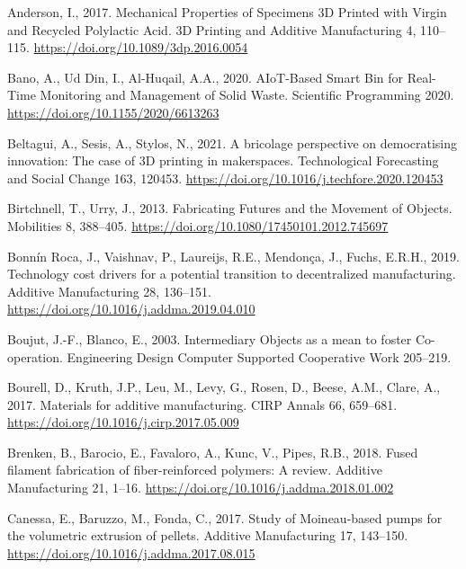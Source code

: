 \documentclass[
  11pt,
]{article}
\newlength{\cslhangindent}
\newlength{\cslentryspacingunit} %
\newenvironment{CSLReferences}[2] %
 {%
  \setlength{\parindent}{0pt}
  \ifodd #1
  \let\oldpar\par
  \def\par{\hangindent=\cslhangindent\oldpar}
  \fi
  \setlength{\parskip}{#2\cslentryspacingunit}
 }%
 {}
\begin{document}
\hypertarget{refs}{}
\begin{CSLReferences}{1}{0}
\leavevmode{}%
Anderson, I., 2017. Mechanical {Properties} of {Specimens 3D Printed}
with {Virgin} and {Recycled Polylactic Acid}. 3D Printing and Additive
Manufacturing 4, 110--115. \url{https://doi.org/10.1089/3dp.2016.0054}

\leavevmode{}%
Bano, A., Ud Din, I., Al-Huqail, A.A., 2020. {AIoT-Based Smart Bin} for
{Real-Time Monitoring} and {Management} of {Solid Waste}. Scientific
Programming 2020. \url{https://doi.org/10.1155/2020/6613263}

\leavevmode{}%
Beltagui, A., Sesis, A., Stylos, N., 2021. A bricolage perspective on
democratising innovation: {The} case of {3D} printing in makerspaces.
Technological Forecasting and Social Change 163, 120453.
\url{https://doi.org/10.1016/j.techfore.2020.120453}

\leavevmode{}%
Birtchnell, T., Urry, J., 2013. Fabricating {Futures} and the {Movement}
of {Objects}. Mobilities 8, 388--405.
\url{https://doi.org/10.1080/17450101.2012.745697}

\leavevmode{}%
Bonnín Roca, J., Vaishnav, P., Laureijs, R.E., Mendonça, J., Fuchs,
E.R.H., 2019. Technology cost drivers for a potential transition to
decentralized manufacturing. Additive Manufacturing 28, 136--151.
\url{https://doi.org/10.1016/j.addma.2019.04.010}

\leavevmode{}%
Boujut, J.-F., Blanco, E., 2003. Intermediary {Objects} as a mean to
foster {Co-operation}. Engineering Design Computer Supported Cooperative
Work 205--219.

\leavevmode{}%
Bourell, D., Kruth, J.P., Leu, M., Levy, G., Rosen, D., Beese, A.M.,
Clare, A., 2017. Materials for additive manufacturing. CIRP Annals 66,
659--681. \url{https://doi.org/10.1016/j.cirp.2017.05.009}

\leavevmode{}%
Brenken, B., Barocio, E., Favaloro, A., Kunc, V., Pipes, R.B., 2018.
Fused filament fabrication of fiber-reinforced polymers: {A} review.
Additive Manufacturing 21, 1--16.
\url{https://doi.org/10.1016/j.addma.2018.01.002}

\leavevmode{}%
Canessa, E., Baruzzo, M., Fonda, C., 2017. Study of {Moineau-based}
pumps for the volumetric extrusion of pellets. Additive Manufacturing
17, 143--150. \url{https://doi.org/10.1016/j.addma.2017.08.015}


\end{CSLReferences}
\end{document}
